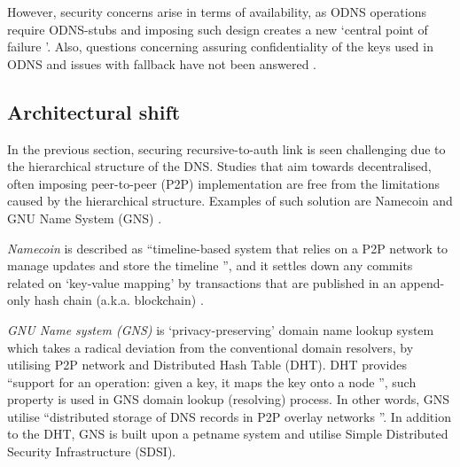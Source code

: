 However, security concerns arise in terms of availability, as ODNS operations require ODNS-stubs and imposing such design creates a new `central point of failure \cite{minutes-102-dprive}'.
Also, questions concerning assuring confidentiality of the keys used in ODNS and issues with fallback have not been answered \cite{minutes-102-dprive}.

\subsection{Architectural shift}
In the previous section, securing recursive-to-auth link is seen challenging due to the hierarchical structure of the DNS.
Studies that aim towards decentralised, often imposing peer-to-peer (P2P) implementation are free from the limitations caused by the hierarchical structure.
Examples of such solution are Namecoin \cite{loibl2014namecoin} and GNU Name System (GNS) \cite{grothoff2017nsa, wachs2014censorship}.

\textit{Namecoin} \cite{loibl2014namecoin} is described as ``timeline-based system that relies on a P2P network to manage updates and store the timeline \cite{grothoff2017nsa}'', and it settles down any commits related on `key-value mapping' by transactions that are published in an append-only hash chain (a.k.a. blockchain) \cite{kalodner2015empirical}.

\textit{GNU Name system (GNS)} is `privacy-preserving' domain name lookup system which takes a radical deviation from the conventional domain resolvers, by utilising P2P network and Distributed Hash Table (DHT).
DHT provides ``support for an operation: given a key, it maps the key onto a node \cite{stoica2001chord}'', such property is used in GNS domain lookup (resolving) process. 
In other words, GNS utilise ``distributed storage of DNS records in P2P overlay networks \cite{wachs2014censorship}''. In addition to the DHT, GNS is built upon a petname system \cite{stiegler2005introduction} and utilise Simple Distributed Security Infrastructure (SDSI).